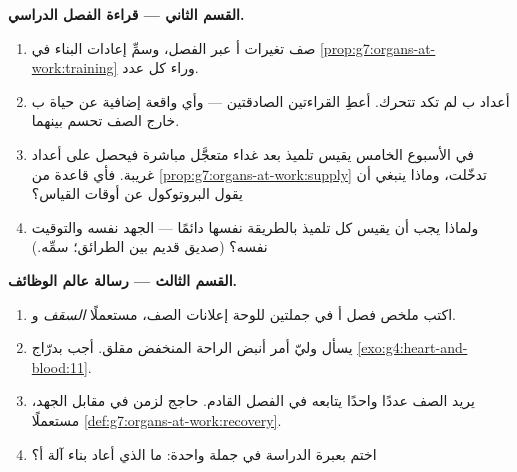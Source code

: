 \begin{problem}
\medskip\noindent\textbf{القسم الثاني --- قراءة الفصل الدراسي.}
\begin{enumerate}[resume]
  \item صف تغيرات أ عبر الفصل، وسمِّ إعادات البناء في
        \cref{prop:g7:organs-at-work:training} وراء كل
        عدد.
  \item أعداد ب لم تكد تتحرك. أعطِ القراءتين الصادقتين --- وأي
        واقعة إضافية عن حياة ب خارج الصف تحسم بينهما.
  \item في الأسبوع الخامس يقيس تلميذ بعد غداء متعجَّل مباشرة
        فيحصل على أعداد غريبة. فأي قاعدة من
        \cref{prop:g7:organs-at-work:supply} تدخّلت، وماذا ينبغي
        أن يقول البروتوكول عن أوقات القياس؟
  \item ولماذا يجب أن يقيس كل تلميذ بالطريقة نفسها دائمًا ---
        الجهد نفسه والتوقيت نفسه؟ (صديق قديم بين الطرائق؛
        سمِّه.)
\end{enumerate}

\medskip\noindent\textbf{القسم الثالث --- رسالة عالم
الوظائف.}
\begin{enumerate}[resume]
  \item اكتب ملخص فصل أ في جملتين للوحة إعلانات الصف، مستعملًا
        \emph{السقف} و\emph{}.
  \item يسأل وليّ أمر أنبض الراحة المنخفض مقلق. أجب بدرّاج
        \cref{exo:g4:heart-and-blood:11}.
  \item يريد الصف عددًا واحدًا يتابعه في الفصل القادم. حاجج
        لزمن  في مقابل  الجهد، مستعملًا
        \cref{def:g7:organs-at-work:recovery}.
  \item اختم بعبرة الدراسة في جملة واحدة: ما الذي أعاد بناء آلة
        أ؟
\end{enumerate}
\end{problem}
